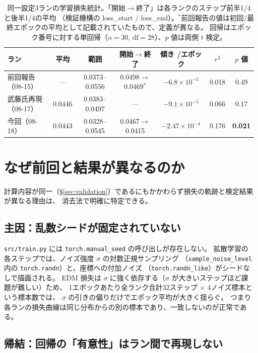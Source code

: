 \documentclass[11pt]{article}
\begin{document}
\begin{table}[h]
\centering
\caption{同一設定3ランの学習損失統計。「開始$\to$終了」は各ランクのステップ前半1/4と後半1/4の平均
（検証機構の loss\_start / loss\_end）。$^{*}$前回報告の値は初回/最終エポックの平均として記載されていたもので、定義が異なる。
回帰はエポック番号に対する単回帰（$n=30$, $\mathrm{df}=28$）、$p$ 値は両側 $t$ 検定。}
\label{tab:loss}
\small
\begin{tabular}{@{}lcccccc@{}}
\toprule
ラン & 平均 & 範囲 & 開始$\to$終了 & 傾き /エポック & $r^2$ & $p$ 値 \\
\midrule
前回報告（08-15） & --- & 0.0373--0.0556 & 0.0498$\to$0.0469$^{*}$ & $-6.8\times10^{-5}$ & 0.018 & 0.49 \\
武藤氏再現（08-17） & 0.0446 & 0.0383--0.0497 & --- & $-9.1\times10^{-5}$ & 0.066 & 0.17 \\
今回（08-18） & 0.0443 & 0.0328--0.0545 & 0.0467$\to$0.0415 & $-2.47\times10^{-4}$ & 0.176 & \textbf{0.021} \\
\bottomrule
\end{tabular}
\end{table}

\section{なぜ前回と結果が異なるのか}
\label{sec:why}

計算内容が同一（\S\ref{sec:validation}）であるにもかかわらず損失の軌跡と検定結果が異なる理由は、
消去法で明確に特定できる。

\subsection{主因：乱数シードが固定されていない}

\texttt{src/train.py} には \texttt{torch.manual\_seed} の呼び出しが存在しない。
拡散学習の各ステップでは、ノイズ強度 $\sigma$ の対数正規サンプリング
（\texttt{sample\_noise\_level} 内の \texttt{torch.randn}）と、座標への付加ノイズ
（\texttt{torch.randn\_like}）がシードなしで描画される。
EDM 損失は $\sigma$ に強く依存する（$\sigma$ が大きいステップほど課題が難しい）ため、
1エポックあたり全ランク合計32ステップ $\times$ 4ノイズ標本という標本数では、
$\sigma$ の引きの偏りだけでエポック平均が大きく揺らぐ。
つまり各ランの損失曲線は同じ分布からの別の標本であり、一致しないのが正常である。

\subsection{帰結：回帰の「有意性」はラン間で再現しない}
\end{document}
